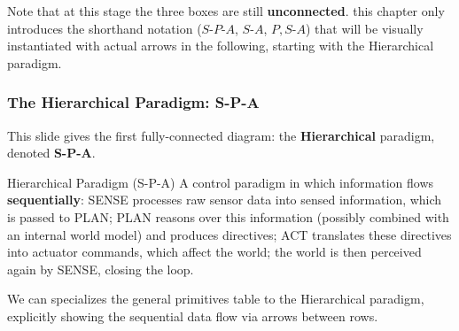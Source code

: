  Note that at this stage the three boxes are still \textbf{unconnected}. this chapter only introduces the shorthand notation ($S$-$P$-$A$, $S$-$A$, $P,S$-$A$) that will be visually instantiated with actual arrows in the following, starting with the Hierarchical paradigm.

\subsubsection{The Hierarchical Paradigm: S-P-A}

This slide gives the first fully-connected diagram: the \textbf{Hierarchical} paradigm, denoted \textbf{S-P-A}.

\begin{center}
\end{center}

\begin{defbox}{Hierarchical Paradigm (S-P-A)}
A control paradigm in which information flows \textbf{sequentially}: SENSE processes raw sensor data into sensed information, which is passed to PLAN; PLAN reasons over this information (possibly combined with an internal world model) and produces directives; ACT translates these directives into actuator commands, which affect the world; the world is then perceived again by SENSE, closing the loop.
\end{defbox}





We can specializes the general primitives table to the Hierarchical paradigm, explicitly showing the sequential data flow via arrows between rows.

